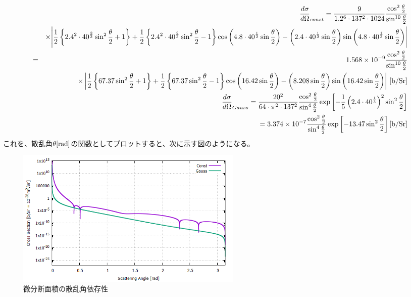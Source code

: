 \documentclass[a4j,fleqn]{jsarticle}
\begin{document}
        \begin{eqnarray}
            &&\frac{d\sigma}{d\Omega}_{const}=\frac{9}{1.2^6\cdot137^2\cdot1024}\frac{\cos^2{\frac{\theta}{2}}}{\sin^{10}{\frac{\theta}{2}}}\\
            \nonumber&&\times\Bigg|\frac{1}{2}\left\{2.4^2\cdot40^{\frac{2}{3}}\sin^2{\frac{\theta}{2}}+1\right\}+\frac{1}{2}\left\{2.4^2\cdot40^{\frac{2}{3}}\sin^2{\frac{\theta}{2}}-1\right\}\cos{\left(4.8\cdot40^{\frac{1}{3}}\sin{\frac{\theta}{2}}\right)}-\left(2.4\cdot40^{\frac{1}{3}}\sin{\frac{\theta}{2}}\right)\sin{\left(4.8\cdot40^{\frac{1}{3}}\sin{\frac{\theta}{2}}\right)}\Bigg|\\
            \nonumber=&&1.568\times10^{-9}\frac{\cos^2{\frac{\theta}{2}}}{\sin^{10}{\frac{\theta}{2}}}\\
            &&\times\left|\frac{1}{2}\left\{67.37\sin^2{\frac{\theta}{2}}+1\right\}+\frac{1}{2}\left\{67.37\sin^2{\frac{\theta}{2}}-1\right\}\cos{\left(16.42\sin{\frac{\theta}{2}}\right)}-\left(8.208\sin{\frac{\theta}{2}}\right)\sin{\left(16.42\sin{\frac{\theta}{2}}\right)}\right|\,{\rm[b/Sr]}\\
            &&\frac{d\sigma}{d\Omega}_{Gauss}=\frac{20^2}{64\cdot\pi^2\cdot137^2}\frac{\cos^2{\frac{\theta}{2}}}{\sin^4{\frac{\theta}{2}}}\exp{\left[-\frac{1}{5}\left(2.4\cdot40^{\frac{1}{3}}\right)^2\sin^2{\frac{\theta}{2}}\right]}\\
            &&=3.374\times10^{-7}\frac{\cos^2{\frac{\theta}{2}}}{\sin^4{\frac{\theta}{2}}}\exp{\left[-13.47\sin^2{\frac{\theta}{2}}\right]}\,{\rm[b/Sr]}
        \end{eqnarray}
        これを、散乱角$\theta{\rm[rad]}$の関数としてプロットすると、次に示す図のようになる。
        \begin{figure}[H]
            \centering
            \includegraphics[bb = 120 0 500 430, width=11.0cm]{tamu_fig03.png}
            \caption{微分断面積の散乱角依存性}
        \end{figure}
    \newpage
\end{document}
